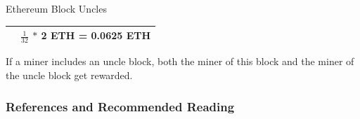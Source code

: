 \documentclass[handout]{beamer}
\begin{document}
\begin{frame}{Ethereum Block Uncles}
{{\begin{tabularx}{300pt}{X X}
			\rowcolor{lightergray}{\footnotesize Uncle Block Inclusion} &{\footnotesize $\frac{1} {32}$ \hspace{1pt} $*$ 2 ETH = 0.0625 ETH}  
			\bigstrut \\
			\bottomrule
		\end{tabularx}
	}
\center 
\begin{tiny}
If a miner includes an uncle block, both the miner of this block and the miner of
the uncle block get rewarded.
\end{tiny}
\vspace{0.5em} }
\end{frame}


\begin{frame}%
\frametitle{References and Recommended Reading}
	
	
\end{frame}
\end{document}

